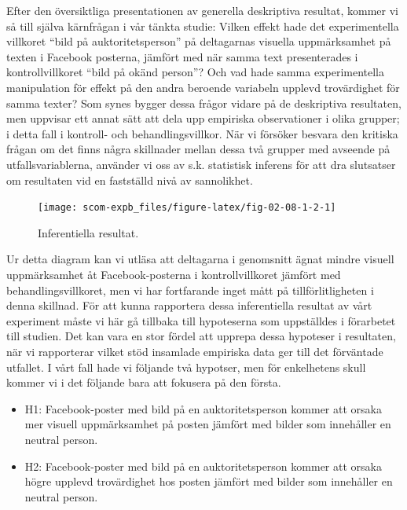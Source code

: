 \documentclass[
]{book}
\begin{document}
Efter den översiktliga presentationen av generella deskriptiva resultat, kommer vi så till själva kärnfrågan i vår tänkta studie: Vilken effekt hade det experimentella villkoret ``bild på auktoritetsperson'' på deltagarnas visuella uppmärksamhet på texten i Facebook posterna, jämfört med när samma text presenterades i kontrollvillkoret ``bild på okänd person''? Och vad hade samma experimentella manipulation för effekt på den andra beroende variabeln upplevd trovärdighet för samma texter? Som synes bygger dessa frågor vidare på de deskriptiva resultaten, men uppvisar ett annat sätt att dela upp empiriska observationer i olika grupper; i detta fall i kontroll- och behandlingsvillkor. När vi försöker besvara den kritiska frågan om det finns några skillnader mellan dessa två grupper med avseende på utfallsvariablerna, använder vi oss av s.k. statistisk inferens för att dra slutsatser om resultaten vid en fastställd nivå av sannolikhet.

\begin{figure}

{\centering \texttt{[image: scom-expb\_files/figure-latex/fig-02-08-1-2-1]} 

}

\caption{Inferentiella resultat.}\label{fig:fig-02-08-1-2}
\end{figure}

Ur detta diagram kan vi utläsa att deltagarna i genomsnitt ägnat mindre visuell uppmärksamhet åt Facebook-posterna i kontrollvillkoret jämfört med behandlingsvillkoret, men vi har fortfarande inget mått på tillförlitligheten i denna skillnad. För att kunna rapportera dessa inferentiella resultat av vårt experiment måste vi här gå tillbaka till hypoteserna som uppställdes i förarbetet till studien. Det kan vara en stor fördel att upprepa dessa hypoteser i resultaten, när vi rapporterar vilket stöd insamlade empiriska data ger till det förväntade utfallet. I vårt fall hade vi följande två hypotser, men för enkelhetens skull kommer vi i det följande bara att fokusera på den första.

\begin{itemize}
\item
  H1: Facebook-poster med bild på en auktoritetsperson kommer att orsaka mer visuell uppmärksamhet på posten jämfört med bilder som innehåller en neutral person.
\item
  H2: Facebook-poster med bild på en auktoritetsperson kommer att orsaka högre upplevd trovärdighet hos posten jämfört med bilder som innehåller en neutral person.
\end{itemize}
\end{document}
